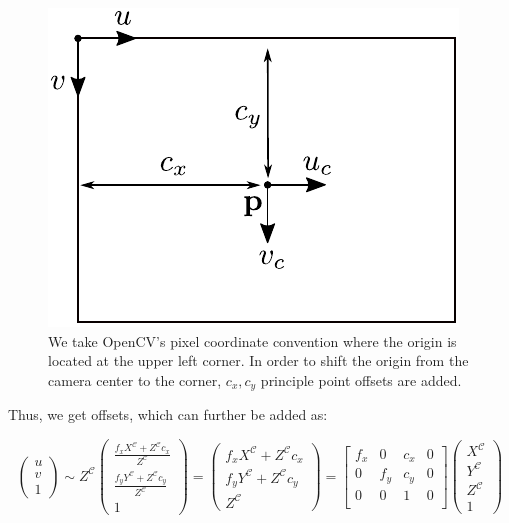 \documentclass[a4paper]{report}
\numberwithin{figure}{section}
\begin{document}
\begin{figure}[H]
	\centering
  \includegraphics[width=0.4\linewidth,natwidth=640,natheight=640]
  {fig/drawings/pinhole_cam_offset.pdf}
	\caption[Principle Point Offset]{We take OpenCV's pixel coordinate 
	convention where the origin is located at the upper left corner. In order 
	to shift the origin from the camera center to the corner, $c_x, c_y$ 
	principle 
	point offsets are added.}
	\label{fig:pinhole_offset}
\end{figure}

Thus, we get offsets, which can further be added as:

\begin{equation}
  \begin{pmatrix}
    u\\
    v\\
    1
  \end{pmatrix}
  \sim
  Z^{\mathcal{C}}
  \begin{pmatrix}
    \frac{f_x X^{\mathcal{C}} + Z^{\mathcal{C}} c_x}{Z^{\mathcal{C}}}\\
    \frac{f_y Y^{\mathcal{C}} + Z^{\mathcal{C}} c_y}{Z^{\mathcal{C}}}\\
    1
  \end{pmatrix}
  =
  \begin{pmatrix}
    f_xX^{\mathcal{C}} + Z^{\mathcal{C}} c_x\\
    f_yY^{\mathcal{C}} + Z^{\mathcal{C}} c_y\\
    Z^{\mathcal{C}}
  \end{pmatrix}
  =
  \begin{bmatrix}
    f_x & 0 & c_x & 0\\
    0 & f_y & c_y & 0\\
    0 & 0 & 1 & 0\\
  \end{bmatrix}
  \begin{pmatrix}
    X^{\mathcal{C}}\\
    Y^{\mathcal{C}}\\
    Z^{\mathcal{C}}\\
    1
  \end{pmatrix}\label{eq:proj_func_w_f_c}
\end{equation} 
\end{document}
